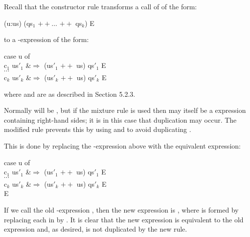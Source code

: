Recall that the constructor rule transforms a call of  of the form:
\begin{mlcoded}
     (u:us) (qs$_1$ $++$$ \ldots$ $++$ qs$_k$) E
\end{mlcoded}
to a -expression of the form:
\begin{letalign}
    case u of\\
    \phantom{.\quad.}c$_1$ us$'_1$ &$\Rightarrow$  (us$'_1$ $++$ us) qs$'_1$ E \\
    \phantom{.\quad.}$\cdots$\\
    \phantom{.\quad.}c$_k$ us$'_k$ &$\Rightarrow$  (us$'_k$ $++$ us) qs$'_k$ E \\
\end{letalign}
where  and  are as described in Section 5.2.3.

Normally  will be , but if the mixture rule is used then  may itself
be a  expression containing right-hand sides; it is in this case that
duplication may occur. The modified rule prevents this by using \fatbar{} and  to
avoid duplicating .


This is done by replacing the -expression above with the equivalent expression:
\begin{letalign}
    case u of\\
    \phantom{.\quad.}c$_1$ us$'_1$ &$\Rightarrow$  (us$'_1$ $++$ us) qs$'_1$ E \\
    \phantom{.\quad.}$\cdots$\\
    \phantom{.\quad.}c$_k$ us$'_k$ &$\Rightarrow$  (us$'_k$ $++$ us) qs$'_k$ E \\
    \fatbar{} E
\end{letalign}
If we call the old -expression , then the new expression is ,
where  is formed by replacing each  in  by . It is clear that the new
expression is equivalent to the old expression and, as desired,  is not
duplicated by the new rule.

